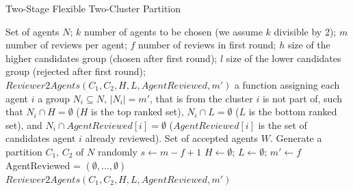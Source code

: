 \documentclass[letterpaper]{article} %
\newcommand{\omer}[1]{\textcolor{red}{\textbf{Omer Says:} #1 }}
\begin{document}
\begin{algorithm}[t]
\small
\caption{Two-Stage Flexible Two-Cluster Partition}\label{2StageFlexPartition}
\begin{algorithmic}[1]
\Require
Set of agents $N$; %
$k$ number of agents to be chosen (we assume $k$ divisible by 2);
\newline
$m$ number of reviews per agent;
\newline
$f$ number of reviews in first round;
\newline
$h$ size of the higher candidates group (chosen after first round);
\newline
$l$ size of the lower candidates group (rejected after first round);
\newline
$Reviewer2Agents(C_{1},C_{2},H,L,AgentReviewed,m')$ a function assigning each agent $i$ a group $N_{i}\subseteq N$, $|N_{i}|=m'$, that is from the cluster $i$ is not part of, such that $N_{i}\cap H=\emptyset$ ($H$ is the top ranked set), $N_{i}\cap L=\emptyset$ ($L$ is the bottom ranked set), and $N_{i}\cap AgentReviewed[i]=\emptyset$ ($AgentReviewed[i]$ is the set of candidates agent $i$ already reviewed).
\newline
\Ensure Set of accepted agents $W$.
\State Generate a partition {$C_{1}$, $C_{2}$} of $N$ randomly
\State $s \gets m - f + 1$ 
\State $H \gets \emptyset$; 
\State $L \gets \emptyset$; 
\State $m' \gets f$ 
\State AgentReviewed = $(\emptyset , \ldots , \emptyset)$
 \State $Reviewer2Agents(C_{1},C_{2},H,L,AgentReviewed,m')$

\end{algorithmic}
\end{algorithm}
\end{document}
